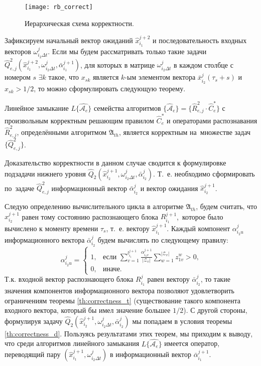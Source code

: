 \begin{figure}[h]
	\centering
	\texttt{[image: rb\_correct]}
	\caption{Иерархическая схема корректности.}
	\label{fig:rb_correct_hier}
\end{figure}
	
Зафиксируем начальный вектор ожиданий $\hat x_{i_1}^{j+2}$ и последовательность входных векторов $\omega_{i_2\Delta{t}}^j$. Если мы будем рассматривать только такие задачи $\hat Q_{e,j}^2(\hat x_{i_1}^{j+2},\omega_{i_2\Delta{t}}^j,\bar\alpha_{i_1}^{j+1})$, для которых в матрице $\omega_{i_2\Delta{t}}^j$ в каждом столбце с номером $s$ ${\exists}k$ такое, что $x_{sk}$ является $k$-ым элементом вектора $\bar x_{i_2}^j(\tau_s+s)$ и $x_{sk}>1/2$, то можно сформулировать следующую теорему.
		
	\begin{Theorem}
		Линейное замыкание $L\{\hat{\mathcal A_e}\}$ семейства алгоритмов $\{\hat{\mathcal A}_e\}=\{\hat R_{e,j}^2\cdot\hat C_e^*\}$ с произвольным корректным решающим правилом $\hat C_e^*$ и операторами распознавания $\hat R_{e,j}^2$, определёнными алгоритмом $\mathfrak A_{th}$, является корректным на~множестве задач $\{\hat Q_{e,j}^2\}$.
	\end{Theorem}
	
	\begin{Proof}
		Доказательство корректности в данном случае сводится к формулировке подзадачи нижнего уровня $\hat Q_2(\hat x_{i_2}^{j+1},\omega_{i_2\Delta t}^j,\bar\alpha_{i_2}^j)$. Т.~е. необходимо сформировать по~задаче $\hat Q_{e,j}^2$ информационный вектор $\bar\alpha_{i_2}^j$ и вектор ожидания $\hat x_{i_2}^{j+1}$.
		
		Следую определению вычислительного цикла в алгоритме $\mathfrak A_{th}$, будем считать, что $\hat x_{i_2}^{j+1}$ равен тому состоянию распознающего блока $R_{i_1}^{j+1}$,~которое было вычислено к моменту времени $\tau_s$, т.~е. вектору $\hat x_{i_1}^{j+1}$. Каждый компонент $\alpha_{i_2u}^j$ информационного вектора $\bar\alpha_{i_2}^j$ будем вычислять по следующему правилу:
		\[
			\alpha_{i_2u}^j=\begin{cases}
				1, & \text{если $\sum\limits_{v=1}^{l_{i_1}^{j+1}}\frac{\alpha_{i_1v}^{j+1}}{|\mathcal{Z}_v|}\sum\limits_{w=1}^{|\mathcal{Z}_v|}z_{1v}^w>0$,}\\
				
				0, & \text{иначе.}
			\end{cases}
		\]
		Т.к. входной вектор распознающего блока $R_{i_1}^j$ равен вектору $\bar\alpha_{i_2}^j$, то такие значения компонентов информационного вектора позволяют удовлетворить ограничениям теоремы \ref{th:correctness_t} (существование такого компонента входного вектора, который бы имел значение большее $1/2$). С другой стороны, формулируя задачу $\hat Q_2(\hat x_{i_2}^{j+1},\omega_{i_2\Delta t}^j,\bar\alpha_{i_2}^j)$ мы попадаем в условия теоремы \ref{th:correctness_d}. Пользуясь результатами этих теорем, мы приходим к выводу, что среди алгоритмов линейного замыкания $L\{\hat{\mathcal A_e}\}$ имеется оператор, переводящий пару $(\hat x_{i_1}^{j+1},\omega_{i_2\Delta t}^j)$ в информационный вектор $\bar\alpha_{i_1}^{j+1}$.
	\end{Proof}

